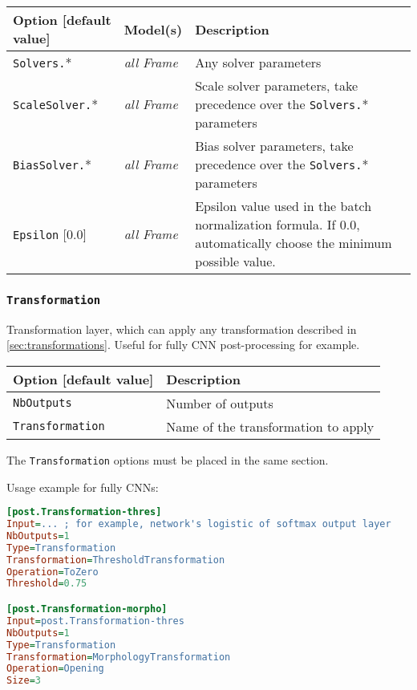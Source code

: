 \documentclass[a4paper,11pt,oneside]{article}
\begin{document}
\begin{center}
 \begin{longtable}{| p{4cm} | p{3cm} | p{9cm} | }
 \hline
 Option [default value] & Model(s) & Description\\
 \hline\hline
  \lstinline!Solvers.!* & \emph{all Frame} & Any solver parameters \\
  \lstinline!ScaleSolver.!* & \emph{all Frame} & Scale solver parameters,
  take precedence over the \lstinline!Solvers.!* parameters \\
  \lstinline!BiasSolver.!* & \emph{all Frame} & Bias solver parameters,
  take precedence over the \lstinline!Solvers.!* parameters \\
  \lstinline!Epsilon! [0.0] & \emph{all Frame} & Epsilon value used in the batch normalization formula. If 0.0, automatically choose the minimum possible
  value. \\
 \hline
\end{longtable}
\end{center}


\subsubsection{\texorpdfstring{%
\lstinline[basicstyle=\ttfamily\bfseries]!Transformation!}{Transformation}}
Transformation layer, which can apply any transformation described in \ref{sec:transformations}. Useful for fully CNN post-processing for example.

\begin{center}
 \begin{longtable}{| p{5cm} | p{10cm} | }
 \hline
 Option [default value] & Description\\
 \hline\hline
  \cellcolor{requiredcolor}\lstinline!NbOutputs! & Number of outputs \\
  \cellcolor{requiredcolor}\lstinline!Transformation! & Name of the
  transformation to apply \\
 \hline
\end{longtable}
\end{center}

The \lstinline!Transformation! options must be placed in the same section.


Usage example for fully CNNs:
\begin{lstlisting}[language=ini]
[post.Transformation-thres]
Input=... ; for example, network's logistic of softmax output layer
NbOutputs=1
Type=Transformation
Transformation=ThresholdTransformation
Operation=ToZero
Threshold=0.75

[post.Transformation-morpho]
Input=post.Transformation-thres
NbOutputs=1
Type=Transformation
Transformation=MorphologyTransformation
Operation=Opening
Size=3
\end{lstlisting}
\end{document}
